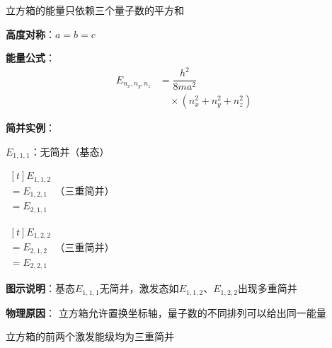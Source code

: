 \begin{frame}{立方箱的能量只依赖三个量子数的平方和}

  \begin{iqbitemize}
    \item \textbf{高度对称}：$a = b = c$

    \item \textbf{能量公式}：
    \[
      \begin{aligned}
        E_{n_x,n_y,n_z} &= \dfrac{h^2}{8ma^2} \\
        &\quad \times (n_x^2 + n_y^2 + n_z^2)
      \end{aligned}
    \]

    \item \textbf{简并实例}：
    \begin{iqbitemize}
      \item $E_{1,1,1}$：无简并（基态）
      \item $\begin{aligned}[t]
        E_{1,1,2} \\
        = E_{1,2,1} \\
        = E_{2,1,1}
      \end{aligned}$（三重简并）
      \item $\begin{aligned}[t]
        E_{1,2,2} \\
        = E_{2,1,2} \\
        = E_{2,2,1}
      \end{aligned}$（三重简并）
    \end{iqbitemize}

    \item \textbf{图示说明}：基态$E_{1,1,1}$无简并，激发态如$E_{1,1,2}$、$E_{1,2,2}$出现多重简并

    \item \textbf{物理原因}：
    立方箱允许置换坐标轴，量子数的不同排列可以给出同一能量
  \end{iqbitemize}
\end{frame}

\begin{frame}{立方箱的前两个激发能级均为三重简并}
\end{frame}

